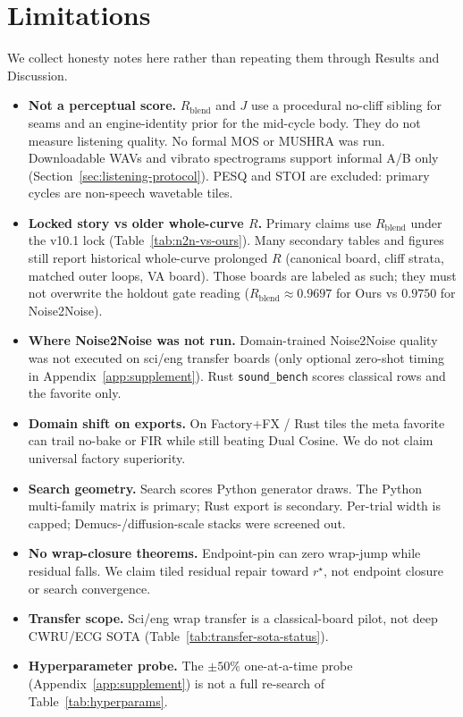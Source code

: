 \section{Limitations}
\label{sec:limitations}

We collect honesty notes here rather than repeating them through Results and Discussion.

\begin{itemize}
  \item \textbf{Not a perceptual score.}
    $R_{\mathrm{blend}}$ and $J$ use a procedural no-cliff sibling for seams and an engine-identity prior for the mid-cycle body.
    They do not measure listening quality.
    No formal MOS or MUSHRA was run.
    Downloadable WAVs and vibrato spectrograms support informal A/B only (Section~\ref{sec:listening-protocol}).
    PESQ and STOI are excluded: primary cycles are non-speech wavetable tiles.
  \item \textbf{Locked story vs older whole-curve $R$.}
    Primary claims use $R_{\mathrm{blend}}$ under the v10.1 lock (Table~\ref{tab:n2n-vs-ours}).
    Many secondary tables and figures still report historical whole-curve prolonged $R$ (canonical board, cliff strata, matched outer loops, VA board).
    Those boards are labeled as such; they must not overwrite the holdout gate reading
    ($R_{\mathrm{blend}}{\approx}0.9697$ for Ours vs $0.9750$ for Noise2Noise).
  \item \textbf{Where Noise2Noise was not run.}
    Domain-trained Noise2Noise quality was not executed on sci/eng transfer boards
    (only optional zero-shot timing in Appendix~\ref{app:supplement}).
    Rust \texttt{sound\_bench} scores classical rows and the favorite only.
  \item \textbf{Domain shift on exports.}
    On Factory+FX / Rust tiles the meta favorite can trail no-bake or FIR while still beating Dual Cosine.
    We do not claim universal factory superiority.
  \item \textbf{Search geometry.}
    Search scores Python generator draws.
    The Python multi-family matrix is primary; Rust export is secondary.
    Per-trial width is capped; Demucs-/diffusion-scale stacks were screened out.
  \item \textbf{No wrap-closure theorems.}
    Endpoint-pin can zero wrap-jump while residual falls.
    We claim tiled residual repair toward $r^{\star}$, not endpoint closure or search convergence.
  \item \textbf{Transfer scope.}
    Sci/eng wrap transfer is a classical-board pilot, not deep CWRU/ECG SOTA
    (Table~\ref{tab:transfer-sota-status}).
  \item \textbf{Hyperparameter probe.}
    The $\pm 50\%$ one-at-a-time probe (Appendix~\ref{app:supplement}) is not a full re-search of Table~\ref{tab:hyperparams}.
\end{itemize}

